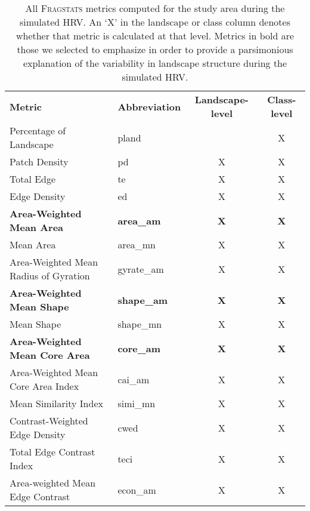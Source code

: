 \begin{itemize}
\begin{table}[]
\centering
\caption{All \textsc{Fragstats} metrics computed for the study area during the simulated HRV. An `X' in the landscape or class column denotes whether that metric is calculated at that level. Metrics in bold are those we selected to emphasize in order to provide a parsimonious explanation of the variability in landscape structure during the simulated HRV.}
\label{tab:fraglist}
\begin{tabular}{@{}llcc@{}}
\cmidrule(r){1-3}
{\bf Metric  }                         & {\bf Abbreviation }   & {\bf Landscape-level} & {\bf Class-level} \\ \cmidrule(r){1-3}
Percentage of Landscape               & pland           &                 & X           \\
Patch Density                         & pd              & X               & X           \\
Total Edge                            & te              & X               & X           \\
Edge Density                          & ed              & X               & X           \\
{\bf Area-Weighted Mean Area}         & {\bf area\_am}  & {\bf X}         & {\bf X}     \\
Mean Area                             & area\_mn        & X               & X           \\
Area-Weighted Mean Radius of Gyration & gyrate\_am      & X               & X           \\
{\bf Area-Weighted Mean Shape}        & {\bf shape\_am} & {\bf X}         & {\bf X}     \\
Mean Shape                            & shape\_mn       & X               & X           \\
{\bf Area-Weighted Mean Core Area}    & {\bf core\_am}  & {\bf X}         & {\bf X}     \\
Area-Weighted Mean Core Area Index    & cai\_am         & X               & X           \\
Mean Similarity Index                 & simi\_mn        & X               & X           \\
Contrast-Weighted Edge Density        & cwed            & X               & X           \\
Total Edge Contrast Index             & teci            & X               & X           \\
Area-weighted Mean Edge Contrast      & econ\_am        & X               & X           \\

\end{tabular}
\end{table}
\end{itemize}
